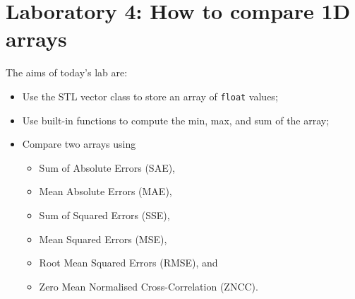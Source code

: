 \documentclass[english,a4paper,12pt,oneside]{article}
\begin{document}

\section*{Laboratory 4: How to compare 1D arrays}

%
%
%
%    
%    

The aims of today's lab are:
\begin{itemize}
	\item Use the STL vector class to store an array of \verb+float+ values;
	\item Use built-in functions to compute the min, max, and sum of the array;
	\item Compare two arrays using 
	\begin{itemize}
	        	\item Sum of Absolute Errors (SAE), 
	        	\item Mean Absolute Errors (MAE), 
		\item Sum of Squared Errors (SSE),
		\item Mean Squared Errors (MSE),
		\item Root Mean Squared Errors (RMSE),  and 
		\item Zero Mean Normalised Cross-Correlation (ZNCC).
    \end{itemize}
\end{itemize}
\end{document}
